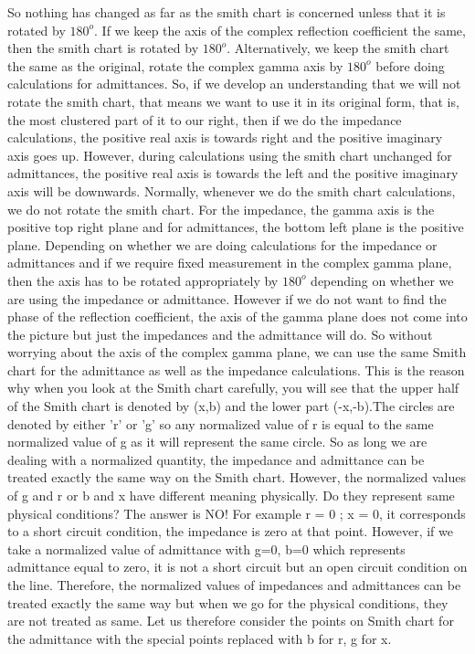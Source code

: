 So nothing has changed as far as the smith chart is concerned unless that it is rotated by $180^o$. If we keep the axis of the complex reflection coefficient the same, then the smith chart is rotated by $180^o$. Alternatively, we keep the smith chart the same as the original, rotate the complex gamma axis by $180^o$ before doing calculations for admittances. So, if we develop an understanding that we will not rotate the smith chart, that means we want to use it in its original form, that is, the most clustered part of it to our right, then if we do the impedance calculations, the positive real axis is towards right and the positive imaginary axis goes up. However, during calculations using the smith chart unchanged for admittances, the positive real axis is towards the left and the  positive imaginary axis will be downwards. Normally, whenever we do the smith chart calculations, we do not rotate the smith chart. For the impedance, the gamma axis is the  positive top right plane and for admittances, the bottom left plane is the positive plane. Depending on whether we are doing calculations for the impedance or admittances and if we require fixed measurement in the complex gamma plane, then the axis has to be rotated appropriately by $180^o$ depending on whether we are using the impedance or admittance. However if we do not want to find the phase of the reflection coefficient, the axis of the gamma plane does not come into the picture but just the impedances and the admittance will do. So without worrying about the axis of the complex gamma plane, we can use the same Smith chart for the admittance as well as the impedance calculations. This is the reason why when you look at the Smith chart carefully, you will see that the upper half of the Smith chart is denoted by (x,b) and the lower part (-x,-b).The circles are denoted by either 'r' or 'g' so any normalized value of r is equal to the same normalized value of g as it will represent the same circle. So as long we are dealing with a normalized quantity, the impedance and admittance can be treated exactly the same way on the Smith chart. However, the normalized values of g and r or b and x have different meaning physically. Do they represent same physical conditions? The answer is NO!  For example r = 0 ; x = 0, it corresponds to a short circuit condition, the impedance is zero at that point. However, if we take  a normalized value of admittance with g=0, b=0 which represents admittance equal to zero, it is not a short circuit but an open circuit condition on the line. Therefore, the normalized values of impedances and admittances can be  treated exactly the same way but when we go for the physical conditions, they are not treated as same. Let us therefore consider the points on Smith chart for the admittance with the special points replaced with b for r, g for x.
